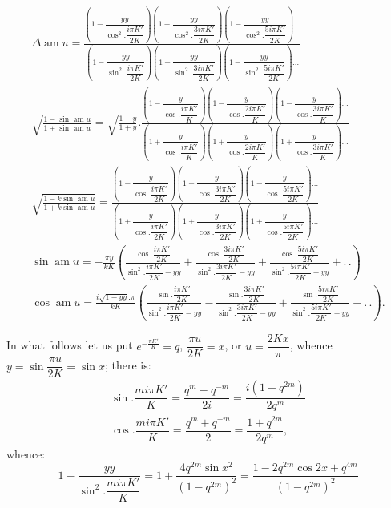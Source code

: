 \documentclass{article}
\begin{document}
\[
\begin{gathered}
\Delta\operatorname{am}u=\frac{\left(1-\dfrac{yy}{\cos^{2}.\dfrac{i\pi K'}{2K}}\right)\left(1-\dfrac{yy}{\cos^{2}.\dfrac{3i\pi K'}{2K}}\right)\left(1-\dfrac{yy}{\cos^{2}.\dfrac{5i\pi K'}{2K}}\right)\ldots}{\left(1-\dfrac{yy}{\sin^{2}.\dfrac{i\pi K'}{2K}}\right)\left(1-\dfrac{yy}{\sin^{2}.\dfrac{3i\pi K'}{2K}}\right)\left(1-\dfrac{yy}{\sin^{2}.\dfrac{5i\pi K'}{2K}}\right)\ldots}
\\[2ex]
\sqrt{\frac{1-\sin\operatorname{am}u}{1+\sin\operatorname{am}u}}=\sqrt{\frac{1-y}{1+y}}.\frac{\left(1-\dfrac{y}{\cos.\dfrac{i\pi K'}{K}}\right)\left(1-\dfrac{y}{\cos.\dfrac{2i\pi K'}{K}}\right)\left(1-\dfrac{y}{\cos.\dfrac{3i\pi K'}{K}}\right)\ldots}{\left(1+\dfrac{y}{\cos.\dfrac{i\pi K'}{K}}\right)\left(1+\dfrac{y}{\cos.\dfrac{2i\pi K'}{K}}\right)\left(1+\dfrac{y}{\cos.\dfrac{3i\pi K'}{K}}\right)\ldots}
\\[2ex]
\sqrt{\frac{1-k\sin\operatorname{am}u}{1+k\sin\operatorname{am}u}}=\frac{\left(1-\dfrac{y}{\cos.\dfrac{i\pi K'}{2K}}\right)\left(1-\dfrac{y}{\cos.\dfrac{3i\pi K'}{2K}}\right)\left(1-\dfrac{y}{\cos.\dfrac{5i\pi K'}{2K}}\right)\ldots}{\left(1+\dfrac{y}{\cos.\dfrac{i\pi K'}{2K}}\right)\left(1+\dfrac{y}{\cos.\dfrac{3i\pi K'}{2K}}\right)\left(1+\dfrac{y}{\cos.\dfrac{5i\pi K'}{2K}}\right)\ldots}
\\[2ex]
\sin\operatorname{am}u=-\frac{\pi y}{kK}\left(\frac{\cos.\dfrac{i\pi K'}{2K}}{\sin^{2}.\dfrac{i\pi K'}{2K}-yy}+\frac{\cos.\dfrac{3i\pi K'}{2K}}{\sin^{2}.\dfrac{3i\pi K'}{2K}-yy}+\frac{\cos.\dfrac{5i\pi K'}{2K}}{\sin^{2}.\dfrac{5i\pi K'}{2K}-yy}+.\,.\right)
\\[2ex]
\cos\operatorname{am}u=\frac{i\sqrt{1-yy}.\pi}{kK}\left(\frac{\sin.\dfrac{i\pi K'}{2K}}{\sin^{2}.\dfrac{i\pi K'}{2K}-yy}-\frac{\sin.\dfrac{3i\pi K'}{2K}}{\sin^{2}.\dfrac{3i\pi K'}{2K}-yy}+\frac{\sin.\dfrac{5i\pi K'}{2K}}{\sin^{2}.\dfrac{5i\pi K'}{2K}-yy}-.\,.\right).
\end{gathered}
\]

In what follows let us put $e^{-\frac{\pi K'}{K}}=q$, $\dfrac{\pi u}{2K}=x$, or $u=\dfrac{2Kx}{\pi}$, whence $y=\sin\dfrac{\pi u}{2K}=\sin x$; there is:
\[
\begin{gathered}
\sin.\dfrac{mi\pi K'}{K}=\dfrac{q^{m}-q^{-m}}{2i}=\dfrac{i(1-q^{2m})}{2q^{m}}
\\[2ex]
\cos.\dfrac{mi\pi K'}{K}=\dfrac{q^{m}+q^{-m}}{2}=\dfrac{1+q^{2m}}{2q^{m}},
\end{gathered}
\]
whence:
\[
1-\frac{yy}{\sin^{2}.\dfrac{mi\pi K'}{K}}=1+\frac{4q^{2m}\sin x^{2}}{(1-q^{2m})^{2}}=\frac{1-2q^{2m}\cos 2x+q^{4m}}{(1-q^{2m})^{2}}
\]
\end{document}
